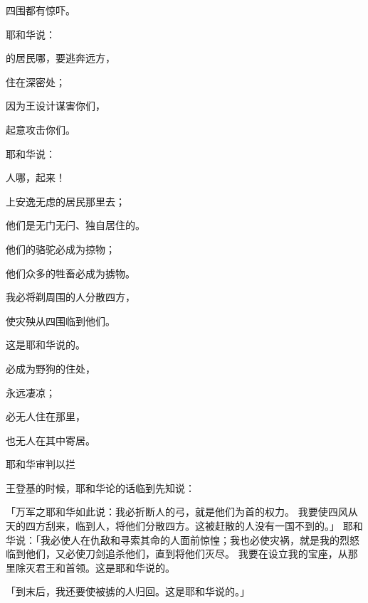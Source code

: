 {\par }{\Q 四围都有惊吓。
\par }{\Q {}耶和华说：
\par }{的居民哪，要逃奔远方，
\par }{\Q 住在深密处；
\par }{\Q 因为{}王{}设计谋害你们，
\par }{\Q 起意攻击你们。
\par }{\BB \par }{\Q {}耶和华说：
\par }{人哪，起来！
\par }{\Q 上安逸无虑的居民那里去；
\par }{\Q 他们是无门无闩、独自居住的。
\par }{\Q {}他们的骆驼必成为掠物；
\par }{\Q 他们众多的牲畜必成为掳物。
\par }{\Q 我必将剃周围{}的人分散四方，
\par }{\Q 使灾殃从四围临到他们。
\par }{\Q 这是耶和华说的。
\par }{\Q {}必成为野狗的住处，
\par }{\Q 永远凄凉；
\par }{\Q 必无人住在那里，
\par }{\Q 也无人在其中寄居。
\par }{\SH 耶和华审判以拦
\par }{\PP {}王{}登基的时候，耶和华论{}的话临到先知{}说：
\par }{\PP {}「万军之耶和华如此说：我必折断{}人的弓，就是他们为首的权力。
我要使四风从天的四方刮来，临到{}人，将他们分散四方。这被赶散的人没有一国不到的。」
耶和华说：「我必使{}人在仇敌和寻索其命的人面前惊惶；我也必使灾祸，就是我的烈怒临到他们，又必使刀剑追杀他们，直到将他们灭尽。
我要在{}设立我的宝座，从那里除灭君王和首领。这是耶和华说的。
\par }{\PP {}「到末后，我还要使被掳的{}人归回。这是耶和华说的。」

}
